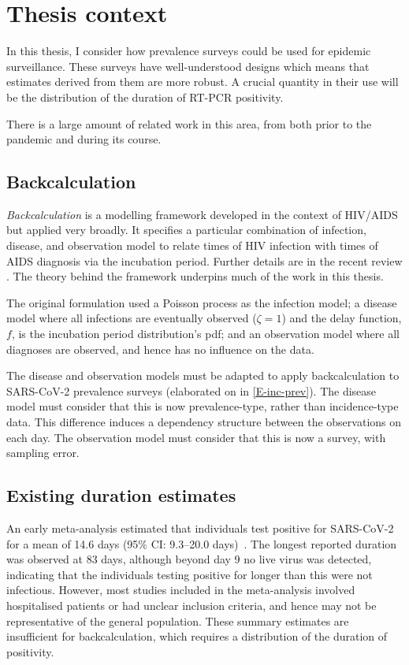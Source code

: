 \documentclass[thesis.tex]{subfiles}
\begin{document}
\section{Thesis context}

In this thesis, I consider how prevalence surveys could be used for epidemic surveillance.
These surveys have well-understood designs which means that estimates derived from them are more robust.
A crucial quantity in their use will be the distribution of the duration of RT-PCR positivity.

There is a large amount of related work in this area, from both prior to the pandemic and during its course.

\subsection{Backcalculation}

\emph{Backcalculation} is a modelling framework developed in the context of HIV/AIDS~\autocite{brookmeyerMethod} but applied very broadly.
It specifies a particular combination of infection, disease, and observation model to relate times of HIV infection with times of AIDS diagnosis via the incubation period.
Further details are in the recent review \textcite{sunModeling}.
The theory behind the framework underpins much of the work in this thesis.

The original formulation used a Poisson process as the infection model; a disease model where all infections are eventually observed ($\zeta = 1$) and the delay function, $f$, is the incubation period distribution's pdf; and an observation model where all diagnoses are observed, and hence has no influence on the data.

The disease and observation models must be adapted to apply backcalculation to SARS-CoV-2 prevalence surveys (elaborated on in \cref{E-inc-prev}).
The disease model must consider that this is now prevalence-type, rather than incidence-type data.
This difference induces a dependency structure between the observations on each day.
The observation model must consider that this is now a survey, with sampling error.

\subsection{Existing duration estimates} \label{intro:sec:previous-duration-estimates}

An early meta-analysis estimated that individuals test positive for SARS-CoV-2 for a mean of 14.6 days (95\% CI: 9.3--20.0 days)~\autocite{cevikShedding}.
The longest reported duration was observed at 83 days, although beyond day 9 no live virus was detected, indicating that the individuals testing positive for longer than this were not infectious.
However, most studies included in the meta-analysis involved hospitalised patients or had unclear inclusion criteria, and hence may not be representative of the general population.
These summary estimates are insufficient for backcalculation, which requires a distribution of the duration of positivity.
\end{document}
